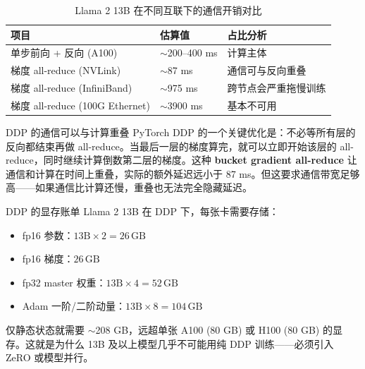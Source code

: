 \begin{table}[H]
\centering
\small
\begin{tabular}{p{4.5cm}p{3cm}p{4.5cm}}
\toprule
\textbf{项目} & \textbf{估算值} & \textbf{占比分析} \\
\midrule
单步前向 + 反向 (A100) & $\sim$200--400 ms & 计算主体 \\
梯度 all-reduce (NVLink) & $\sim$87 ms & 通信可与反向重叠 \\
梯度 all-reduce (InfiniBand) & $\sim$975 ms & 跨节点会严重拖慢训练 \\
梯度 all-reduce (100G Ethernet) & $\sim$3900 ms & 基本不可用 \\
\bottomrule
\end{tabular}
\caption{Llama 2 13B 在不同互联下的通信开销对比}
\end{table}

\begin{importantbox}{DDP 的通信可以与计算重叠}
PyTorch DDP 的一个关键优化是：不必等所有层的反向都结束再做 all-reduce。当最后一层的梯度算完，就可以立即开始该层的 all-reduce，同时继续计算倒数第二层的梯度。这种 \textbf{bucket gradient all-reduce} 让通信和计算在时间上重叠，实际的额外延迟远小于 87 ms。但这要求通信带宽足够高——如果通信比计算还慢，重叠也无法完全隐藏延迟。
\end{importantbox}

\begin{knowledgebox}{DDP 的显存账单}
Llama 2 13B 在 DDP 下，每张卡需要存储：
\begin{itemize}
    \item fp16 参数：$13\text{B} \times 2 = 26\,\text{GB}$
    \item fp16 梯度：$26\,\text{GB}$
    \item fp32 master 权重：$13\text{B} \times 4 = 52\,\text{GB}$
    \item Adam 一阶/二阶动量：$13\text{B} \times 8 = 104\,\text{GB}$
\end{itemize}
仅静态状态就需要 $\sim$208 GB，远超单张 A100 (80 GB) 或 H100 (80 GB) 的显存。这就是为什么 13B 及以上模型几乎不可能用纯 DDP 训练——必须引入 ZeRO 或模型并行。
\end{knowledgebox}

